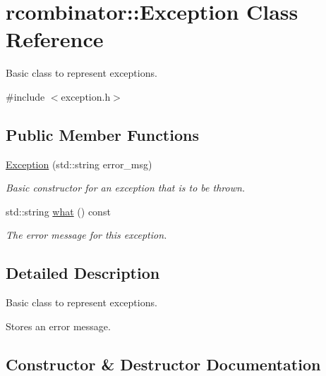 \hypertarget{classrcombinator_1_1Exception}{}\section{rcombinator\+:\+:Exception Class Reference}
\label{classrcombinator_1_1Exception}


Basic class to represent exceptions.  




{\ttfamily \#include $<$exception.\+h$>$}

\subsection*{Public Member Functions}
\begin{DoxyCompactItemize}
\item 
\mbox{\hyperlink{classrcombinator_1_1Exception_a7d3c8825d7c2d7d1d8c9c537725734de}{Exception}} (std\+::string error\+\_\+msg)
\begin{DoxyCompactList}\small\item\em Basic constructor for an exception that is to be thrown. \end{DoxyCompactList}\item 
\mbox{\label{classrcombinator_1_1Exception_ae91e04f748b6e093c7370ed2b1649d07}} 
std\+::string \mbox{\hyperlink{classrcombinator_1_1Exception_ae91e04f748b6e093c7370ed2b1649d07}{what}} () const
\begin{DoxyCompactList}\small\item\em The error message for this exception. \end{DoxyCompactList}\end{DoxyCompactItemize}


\subsection{Detailed Description}
Basic class to represent exceptions. 

Stores an error message. 

\subsection{Constructor \& Destructor Documentation}
\mbox{\label{classrcombinator_1_1Exception_a7d3c8825d7c2d7d1d8c9c537725734de}} 

